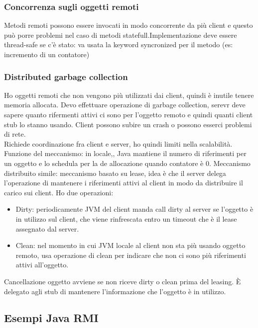 \documentclass[16px]{article}
\begin{document}
\subsubsection{Concorrenza sugli oggetti remoti}
Metodi remoti possono essere invocati in modo concorrente da più client e questo può porre problemi nel caso di metodi statefull.Implementazione deve essere thread-safe se c'è stato: va usata la keyword syncronized per il metodo (es: incremento di un contatore)
\subsubsection{Distributed garbage collection}
Ho oggetti remoti che non vengono più utilizzati dai client, quindi è inutile tenere memoria allocata. Devo effettuare operazione di garbage collection, serevr deve sapere quanto rifermenti attivi ci sono per l'oggetto remoto e quindi quanti client stub lo stanno usando. Client possono subire un crash o possono esserci problemi di rete.\\ Richiede coordinazione fra client e server, ho quindi limiti nella scalabilità. Funzione del meccanismo: in locale,, Java mantiene il numero di riferimenti per un oggetto e lo schedula per la de allocazione quando contatore è 0. Meccanismo distribuito simile: meccanismo basato su lease, idea è che il server delega l'operazione di mantenere i riferimenti attivi al client in modo da distribuire il carico sui client. Ho due operazioni:
\begin{itemize}
\item Dirty: periodicamente JVM del client manda call dirty al server se l'oggetto è in utilizzo sul client, che viene rinfrescata entro un timeout che è il lease assegnato dal server.
\item Clean: nel momento in cui JVM locale al client non sta più usando oggetto remoto, usa operazione di clean per indicare che non ci sono più riferimenti attivi all'oggetto.
\end{itemize}
Cancellazione oggetto avviene se non riceve dirty o clean prima del leasing. È delegato agli stub di mantenere l'informazione che l'oggetto è in utilizzo.\\ 
\subsection{Esempi Java RMI}
\end{document}
